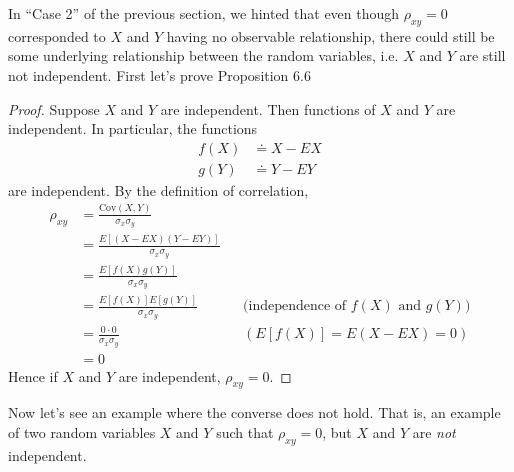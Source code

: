 \documentclass[11pt,letterpaper]{article}
\newcommand\cov{\text{Cov}}
\numberwithin{theorem}{section}
\numberwithin{definition}{section}
\numberwithin{lemma}{section}
\numberwithin{corollary}{section}
\numberwithin{proposition}{section}
\theoremstyle{definition}
\numberwithin{remark}{section}
\numberwithin{claim}{section}
\numberwithin{observation}{section}
\numberwithin{fact}{section}
\numberwithin{assumption}{section}
\numberwithin{example}{section}
\numberwithin{exercise}{section}
\begin{document}
In ``Case 2'' of the previous section, we hinted that even though $\rho_{xy}= 0$ corresponded to $X$ and $Y$ having no observable relationship, there could still be some underlying relationship between the random variables, i.e. $X$ and $Y$ are still not independent. First let's prove Proposition 6.6
\begin{proof}
Suppose $X$ and $Y$ are independent. Then functions of $X$ and $Y$ are independent. In particular, the functions
\begin{align*}
f(X) &\doteq X - EX \\
g(Y) &\doteq Y - EY
\end{align*}
are independent. By the definition of correlation,
\begin{align*}
\rho_{xy} &= \frac{\cov(X,Y)}{\sigma_x \sigma_y} \\
&= \frac{E[(X-EX)(Y-EY)]}{\sigma_x \sigma_y} \\
&= \frac{E[f(X)g(Y)]}{\sigma_x \sigma_y}\\
&= \frac{E[f(X)] E[g(Y)]}{\sigma_x\sigma_y} &&\text{(independence of $f(X)$ and $g(Y)$)} \\
&= \frac{0 \cdot 0}{\sigma_x \sigma_y} &&(E[f(X)] = E(X - EX) = 0)\\
&= 0
\end{align*}
Hence if $X$ and $Y$ are independent, $\rho_{xy} = 0$.
\end{proof}

Now let's see an example where the converse does not hold. That is, an example of two random variables $X$ and $Y$ such that $\rho_{xy} = 0$, but $X$ and $Y$ are \textit{not} independent.
\end{document}
